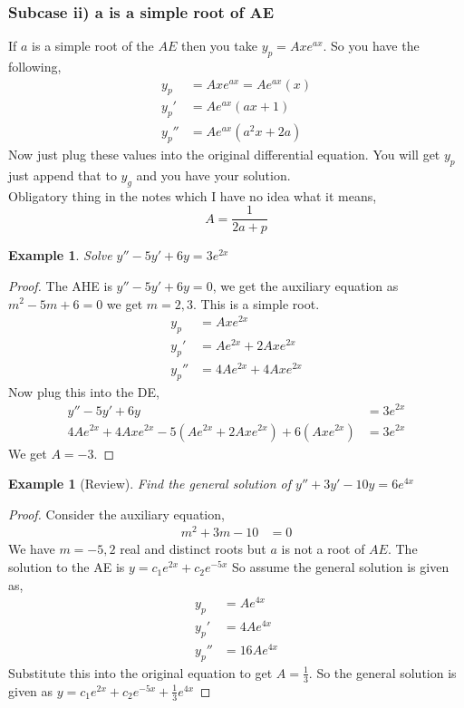 \documentclass[oneside,11pt,pdftex,final]{book}%
\numberwithin{equation}{section}
\newtheorem{example}[theorem]{Example}
\numberwithin{section}{chapter}
\numberwithin{equation}{chapter}
\begin{document}
\subsubsection{Subcase ii) a is a simple root of AE}
If $ a $ is a simple root of the $ AE $ then you take $ y_p=Axe^{ax} $. So you have the following,
\begin{align*}
	y_p&=Axe^{ax}=Ae^{ax}(x)\\
	y_p'&=Ae^{ax}(ax+1)\\
	y_p''&=Ae^{ax}(a^2x+2a)
\end{align*}
Now just plug these values into the original differential equation. You will get $ y_p $ just append that to $ y_g $ and you have your solution.\\

Obligatory thing in the notes which I have no idea what it means, \[ A=\frac{1}{2a+p} \]

\begin{example}
	Solve $ y''- 5y'+6y=3e^{2x}$
\end{example}
\begin{proof}
	The AHE is $ y''-5y'+6y=0 $, we get the auxiliary equation as $ m^2-5m+6=0 $ we get $ m=2,3$. This is a simple root.
	 \begin{align*}
		y_p&=Axe^{2x}\\
		y_p'&=Ae^{2x}+2Axe^{2x}\\
		y_p''&=4Ae^{2x}+4Axe^{2x}
	\end{align*}
Now plug this into the DE,
\begin{align*}
	y''- 5y'+6y&=3e^{2x}\\
	4Ae^{2x}+4Axe^{2x}-5(Ae^{2x}+2Axe^{2x})+6(Axe^{2x})&=3e^{2x}
\end{align*}
We get $ A=-3 $.
\end{proof}

\begin{example}[Review]
	Find the general solution of $ y''+3y'-10y=6e^{4x} $
\end{example}
\begin{proof}
	Consider the auxiliary equation,
	\begin{align*}
		m^2+3m-10&=0
	\end{align*}
We have $ m=-5,2 $ real and distinct roots but $ a $ is not a root of $ AE $. The solution to the AE is $ y=c_1e^{2x}+c_2e^{-5x} $
So assume the general solution is given as,
\begin{align*}
	y_p&= Ae^{4x}\\
	y_p'&=4Ae^{4x}\\
	y_p''&=16Ae^{4x}
\end{align*}
Substitute this into the original equation to get $ A=\frac{1}{3} $.
So the general solution is given as $ y=c_1e^{2x}+c_2e^{-5x}+\frac{1}{3}e^{4x} $

\end{proof}
\end{document}

